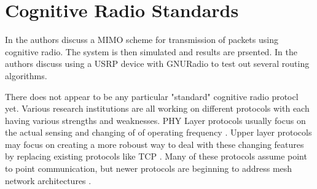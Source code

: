 \section{Cognitive Radio Standards}
In \cite{7124942} the authors discuss a MIMO scheme for transmission of packets using cognitive radio. The system is then simulated and results are prsented. 
In \cite{5784217} the authors discuss using a USRP device with GNURadio to test out several routing algorithms.  

There does not appear to be any particular "standard" cognitive radio protocl yet. Various research
institutions are all working on different protocols with each having various strengths and weaknesses.
PHY Layer protocols usually focus on the actual sensing and changing of of operating frequency 
\cite{6730802}. Upper layer protocols may focus on creating a more roboust way to deal with these 
changing features by replacing existing protocols like TCP \cite{5062176}. Many of these
protocols assume point to point communication, but newer protocols are beginning to address mesh
network architectures \cite{5738222}. 
